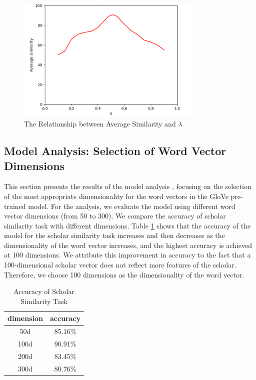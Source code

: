 \documentclass[a4paper]{jpconf}
\begin{document}
\begin{figure}[htbp] %
\centering %
\includegraphics[width=9cm]{img/Aver.png}
\caption{The Relationship between Average Similarity and $\lambda$} %
\label{Average} %
\end{figure}

\subsection{Model Analysis: Selection of Word Vector Dimensions}
This section presents the results of the model analysis \cite{8318770}, focusing on the
selection of the most appropriate dimensionality for the word vectors in
the GloVe pre-trained model. For the analysis, we evaluate the model
using different word vector dimensions (from 50 to 300). We compare the
accuracy of scholar similarity task with different dimensions.
Table \ref{tab:addlabel} shows that the accuracy of the model for the scholar
similarity task increases and then decreases as the dimensionality of
the word vector increases, and the highest accuracy is achieved at 100
dimensions. We attribute this improvement in accuracy to the fact that a
100-dimensional scholar vector does not reflect more features of the
scholar. Therefore, we choose 100 dimensions as the dimensionality of the
word vector.

\begin{table}[htbp]
  \centering
  \caption{Accuracy of Scholar Similarity Task}
    \begin{tabular}{cc}
    \toprule
    \multicolumn{1}{l}{dimension} & \multicolumn{1}{l}{accuracy} \\
    \midrule
    50d   & 85.16\% \\
    100d  & 90.91\% \\
    200d  & 83.45\% \\
    300d  & 80.76\% \\
    \bottomrule
    \end{tabular}%
  \label{tab:addlabel}%
\end{table}%
\end{document}

